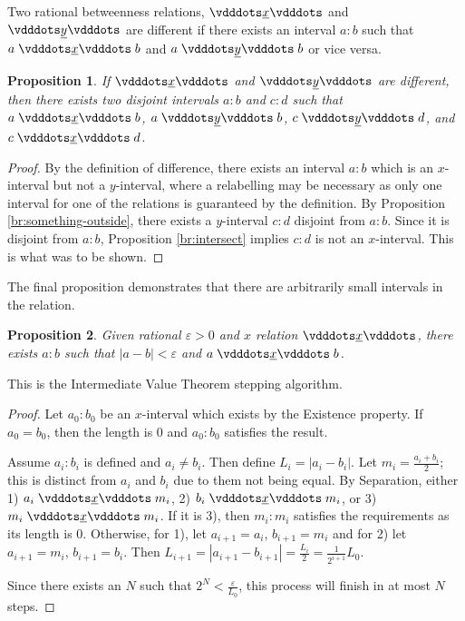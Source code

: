 \documentclass[12pt]{article}
\newtheorem{proposition}{Proposition}[section]
\begin{document}
Two rational betweenness relations, $\xrel$ and $\xrel[y]$ are different if there exists an interval $a:b$ such that $a \xrel b$ and \sout{$a \xrel[y] b$} or vice versa. 

\begin{proposition}\label{br:different}
    If $\xrel$ and $\xrel[y]$ are different, then there exists two disjoint intervals $a:b$ and $c:d$ such that $a \xrel b$, \sout{$a \xrel[y] b$}, $c \xrel[y] d$, and \sout{$c \xrel d$}.
\end{proposition}


\begin{proof}
    By the definition of difference, there exists an interval $a:b$ which is an $x$-interval but not a $y$-interval, where a relabelling may be necessary as only one interval for one of the relations is guaranteed by the definition. By Proposition \ref{br:something-outside}, there exists a $y$-interval $c:d$ disjoint from $a:b$. Since it is disjoint from $a:b$, Proposition \ref{br:intersect} implies $c:d$ is not an $x$-interval. This is what was to be shown. 
\end{proof}


The final proposition demonstrates that there are arbitrarily small intervals in the relation. 

\begin{proposition}
    Given rational $\varepsilon >0$ and $x$ relation $\xrel$, there exists $a:b$ such that $|a-b| < \varepsilon$ and $a \xrel b$. 
\end{proposition}

This is the Intermediate Value Theorem stepping algorithm. 

\begin{proof}
    Let $a_0:b_0$ be an $x$-interval which exists by the Existence property. If $a_0 = b_0$, then the length is 0 and $a_0:b_0$ satisfies the result. 
    
    Assume $a_i:b_i$ is defined and $a_i \neq b_i$. Then define $L_i = |a_i - b_i|$. Let $m_i = \frac{a_i + b_i}{2}$; this is distinct from $a_i$ and $b_i$ due to them not being equal. By Separation, either 1) $a_i \xrel m_i$, 2) $b_i \xrel m_i$, or 3) $m_i \xrel m_i$. If it is 3), then $m_i:m_i$ satisfies the requirements as its length is 0. Otherwise, for 1), let $a_{i+1}= a_i$, $b_{i+1} = m_i$ and for 2) let $a_{i+1} = m_i$, $b_{i+1} = b_i$. Then $L_{i+1} = |a_{i+1} - b_{i+1}| = \frac{L_i}{2} = \frac{1}{2^{i+1}} L_0 $. 

    Since there exists an $N$ such that $2^N < \frac{\varepsilon}{L_0}$, this process will finish in at most $N$ steps. 

    
\end{proof}
\end{document}
